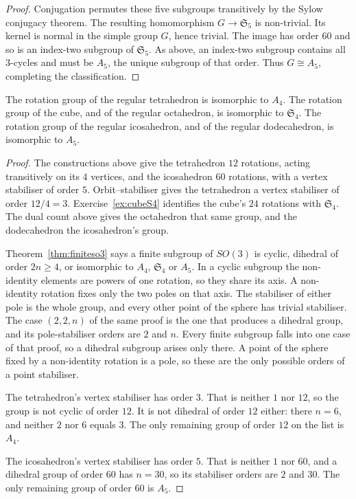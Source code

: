 \begin{proof}
Conjugation permutes these
five subgroups transitively
by the Sylow conjugacy
theorem. The resulting
homomorphism
$G\to\mathfrak S_5$
is non-trivial. Its kernel
is normal in the simple group
$G$, hence trivial. The image
has order $60$ and so is an
index-two subgroup of
$\mathfrak S_5$. As above,
an index-two subgroup contains
all $3$-cycles and must be
$A_5$, the unique subgroup
of that order. Thus
$G\cong A_5$, completing
the classification.
\end{proof}

\begin{proposition}\label{prop:solids}
The rotation group of the regular tetrahedron is isomorphic to $A_4$. The rotation group of the cube, and of the regular octahedron, is isomorphic to $\mathfrak S_4$. The rotation group of the regular icosahedron, and of the regular dodecahedron, is isomorphic to $A_5$.
\end{proposition}
\begin{proof}
The constructions above give the tetrahedron $12$ rotations, acting transitively on its $4$ vertices, and the icosahedron $60$ rotations, with a vertex stabiliser of order $5$. Orbit--stabiliser gives the tetrahedron a vertex stabiliser of order $12/4=3$. Exercise~\ref{ex:cubeS4} identifies the cube's $24$ rotations with $\mathfrak S_4$. The dual count above gives the octahedron that same group, and the dodecahedron the icosahedron's group.

Theorem~\ref{thm:finiteso3} says a finite subgroup of $SO(3)$ is cyclic, dihedral of order $2n\ge4$, or isomorphic to $A_4$, $\mathfrak S_4$ or $A_5$. In a cyclic subgroup the non-identity elements are powers of one rotation, so they share its axis. A non-identity rotation fixes only the two poles on that axis. The stabiliser of either pole is the whole group, and every other point of the sphere has trivial stabiliser. The case $(2,2,n)$ of the same proof is the one that produces a dihedral group, and its pole-stabiliser orders are $2$ and $n$. Every finite subgroup falls into one case of that proof, so a dihedral subgroup arises only there. A point of the sphere fixed by a non-identity rotation is a pole, so these are the only possible orders of a point stabiliser.

The tetrahedron's vertex stabiliser has order $3$. That is neither $1$ nor $12$, so the group is not cyclic of order $12$. It is not dihedral of order $12$ either: there $n=6$, and neither $2$ nor $6$ equals $3$. The only remaining group of order $12$ on the list is $A_4$.

The icosahedron's vertex stabiliser has order $5$. That is neither $1$ nor $60$, and a dihedral group of order $60$ has $n=30$, so its stabiliser orders are $2$ and $30$. The only remaining group of order $60$ is $A_5$.
\end{proof}

